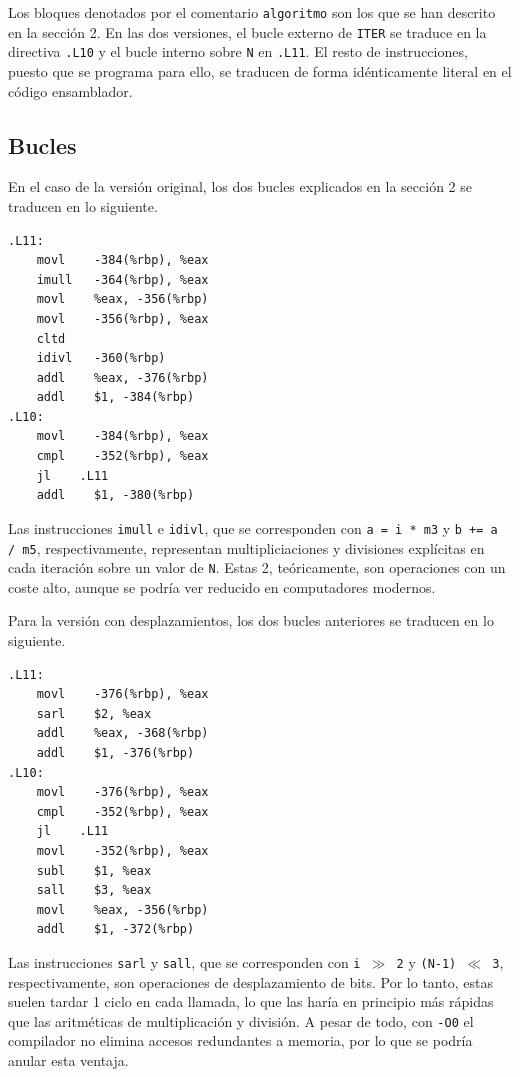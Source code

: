 \documentclass[11pt,a4paper,twoside]{article}
\theoremstyle{definition}
\begin{document}
	Los bloques denotados por el comentario \texttt{algoritmo} son los que se han descrito en la sección 2. En las dos versiones, el bucle externo de \texttt{ITER} se traduce en la directiva \texttt{.L10} y el bucle interno sobre \texttt{N} en \texttt{.L11}. El resto de instrucciones, puesto que se programa para ello, se traducen de forma idénticamente literal en el código ensamblador.

	\subsection{Bucles}
	
	En el caso de la versión original, los dos bucles explicados en la sección 2 se traducen en lo siguiente.
	
	\begin{verbatim}
.L11:
	movl	-384(%rbp), %eax
	imull	-364(%rbp), %eax
	movl	%eax, -356(%rbp)
	movl	-356(%rbp), %eax
	cltd
	idivl	-360(%rbp)
	addl	%eax, -376(%rbp)
	addl	$1, -384(%rbp)
.L10:
	movl	-384(%rbp), %eax
	cmpl	-352(%rbp), %eax
	jl	  .L11
	addl	$1, -380(%rbp)
	\end{verbatim}

	Las instrucciones \texttt{imull} e \texttt{idivl}, que se corresponden con \texttt{a = i * m3} y \texttt{b += a / m5}, respectivamente, representan multipliciaciones y divisiones explícitas en cada iteración sobre un valor de \texttt{N}. Estas 2, teóricamente, son operaciones con un coste alto, aunque se podría ver reducido en computadores modernos.
	
	Para la versión con desplazamientos, los dos bucles anteriores se traducen en lo siguiente.
	
	\begin{verbatim}
.L11:
	movl	-376(%rbp), %eax
	sarl	$2, %eax
	addl	%eax, -368(%rbp)
	addl	$1, -376(%rbp)
.L10:
	movl	-376(%rbp), %eax
	cmpl	-352(%rbp), %eax
	jl	  .L11
	movl	-352(%rbp), %eax
	subl	$1, %eax
	sall	$3, %eax
	movl	%eax, -356(%rbp)
	addl	$1, -372(%rbp)
	\end{verbatim}

	Las instrucciones \texttt{sarl} y \texttt{sall}, que se corresponden con \texttt{i $\gg$ 2} y \texttt{(N-1) $\ll$ 3}, respectivamente, son operaciones de desplazamiento de bits. Por lo tanto, estas suelen tardar 1 ciclo en cada llamada, lo que las haría en principio más rápidas que las aritméticas de multiplicación y división. A pesar de todo, con \texttt{-O0} el compilador no elimina accesos redundantes a memoria, por lo que se podría anular esta ventaja.
	
\end{document}
